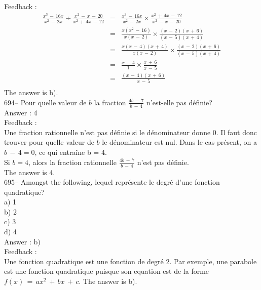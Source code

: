 ﻿\documentclass[letterpaper, 12pt]{article}
\begin{document}
Feedback : \\
\begin{eqnarray*}
\frac{x^{3}\,-\,16x}{x^{2}\,-\,2x}\div
\frac{x^{2}\,-\,x\,-\,20}{x^{2}\,+\,4x\,-\,12}&=&\frac{x^{3}\,-\,16x}{x^{2}\,-\,2x}\times\frac{x^{2}\,+\,4x\,-\,12}{x^{2}\,-\,x\,-\,20}\\[2mm]
&=&\frac{x(x^{2}\,-\,16)}{x(x\,-\,2)}\times
\frac{(x\,-\,2)(x\,+\,6)}{(x\,-\,5)(x\,+\,4)}\\[2mm]
&=&\frac{x(x\,-\,4)(x\,+\,4)}{x(x\,-\,2)}\times\frac{(x\,-\,2)(x\,+\,6)}{(x\,-\,5)(x\,+\,4)}\\[2mm]
&=&\frac{x\,-\,4}{1}\times \frac{x\,+\,6}{x\,-\,5}\\[2mm]
&=&\frac{(x\,-\,4)(x\,+\,6)}{x\,-\,5}\\[2mm]
\end{eqnarray*}
The answer is b).\\

694-- Pour quelle valeur de $b$ la fraction $\frac{4b\,-\,7}{b\,-\,4}$
n'est-elle pas d\'efinie?\\

Answer : 4\\

Feedback : \\
Une fraction rationnelle n'est pas d\'efinie si le d\'enominateur donne 0.
Il faut donc trouver pour quelle valeur de $b$ le d\'enominateur est nul.
Dans le cas pr\'esent, on a $b\,-\,4=0$, ce qui entra\^ine b = 4.\\

Si $b=4$, alors la fraction rationnelle $\frac{4b\,-\,7}{b\,-\,4}$ n'est pas
d\'efinie.\\
The answer is 4.\\

695-- Amongst the following, lequel repr\'esente le degr\'e d'une
fonction quadratique?\\
a) 1\\
b) 2\\
c) 3\\
d) 4\\

Answer : b)\\

Feedback : \\
Une fonction quadratique est une fonction de degr\'e 2.  Par exemple, une
parabole est une fonction quadratique puisque son equation est de la forme
$f(x)\,=\,ax^2 \,+\, bx \,+\, c$.  The answer is b).\\
\end{document}
